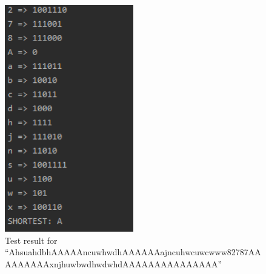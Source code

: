 \documentclass{article}
\newcommand{\quotes}[1]{``#1''}
\begin{document}
				\begin{figure}[H]
					\centering
			 			\includegraphics[width=0.5\textwidth]{hctest5.png}
			 			\centering
			  			\caption{Test result for \quotes{AhsuahdbhAAAAAncuwhwdhAAAAAAajncuhwcuwcwww82787AAAAAAAAAxnjhuwbwdhwdwhdAAAAAAAAAAAAAAA}}
			  			\label{fig:hctest5}
					\end{figure}
					
\end{document}
